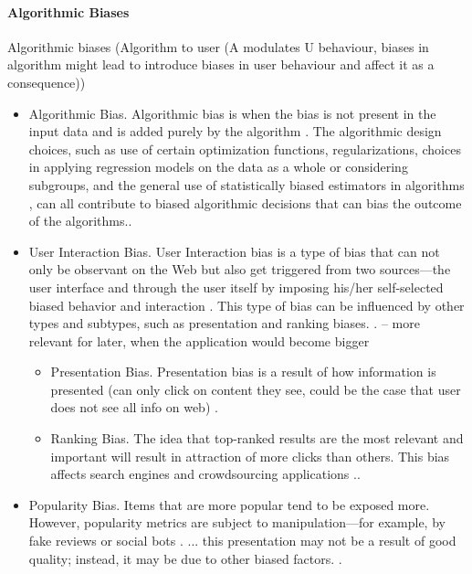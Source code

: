 \documentclass[12pt, a4paper, oneside]{book}   	%
\begin{document}
			
			\paragraph{Algorithmic Biases}
			
			Algorithmic biases (Algorithm to user (A modulates U behaviour, biases in algorithm might lead to introduce biases in user behaviour and affect it as a consequence)) \autocite{Mehrabi_2021}
			\begin{itemize}
				\item Algorithmic Bias. Algorithmic bias is when the bias is not present in the input data and is added purely by the algorithm \autocite{M9_Baeza-Yates_2018}. The algorithmic design choices, such as use of certain optimization functions, regularizations, choices in applying regression models on the data as a whole or considering subgroups, and the general use of statistically biased estimators in algorithms \autocite{M44_Danks_2017}, can all contribute to biased algorithmic decisions that can bias the outcome of the algorithms.\autocite{Mehrabi_2021}.
				\item User Interaction Bias. User Interaction bias is a type of bias that can not only be observant on the Web but also get triggered from two sources—the user interface and through the user itself by imposing his/her self-selected biased behavior and interaction \autocite{M9_Baeza-Yates_2018}. This type of bias can be influenced by other types and subtypes, such as presentation and ranking biases. \autocite{Mehrabi_2021}. -- more relevant for later, when the application would become bigger
				\begin{itemize}
					\item Presentation Bias. Presentation bias is a result of how information is presented \autocite{M9_Baeza-Yates_2018} (can only click on content they see, could be the case that user does not see all info on web) \autocite{Mehrabi_2021}.
					\item Ranking Bias. The idea that top-ranked results are the most relevant and important will result in attraction of more clicks than others. This bias affects search engines \autocite{M9_Baeza-Yates_2018} and crowdsourcing applications \autocite{M93_Lerman_2014}.\autocite{Mehrabi_2021}.
				\end{itemize}
				\item Popularity Bias. Items that are more popular tend to be exposed more. However, popularity metrics are subject to manipulation—for example, by fake reviews or social bots \autocite{M117_Ciampaglia_2018}. ... this presentation may not be a result of good quality; instead, it may be due to other biased factors. \autocite{Mehrabi_2021}.

\end{itemize}
\end{document}
